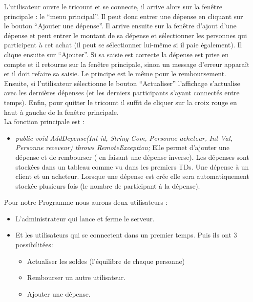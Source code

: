 \documentclass[12,french]{report}
\begin{document}
L’utilisateur ouvre le tricount et se connecte, il arrive alors sur la fenêtre principale : le “menu principal”. Il peut donc entrer une dépense en cliquant sur le bouton “Ajouter une dépense”. Il arrive ensuite sur la fenêtre d’ajout d’une dépense et peut entrer le montant de sa dépense et sélectionner les personnes qui participent à cet achat (il peut se sélectionner lui-même si il paie également). Il clique ensuite sur “Ajouter”. Si sa saisie est correcte la dépense est prise en compte et il retourne sur la fenêtre principale, sinon un message d’erreur apparaît et il doit refaire sa saisie.
Le principe est le même pour le remboursement.
Ensuite, si l’utilisateur sélectionne le bouton “Actualiser” l’affichage s’actualise avec les dernières dépenses (et les derniers participants s'ayant connectés entre temps).
Enfin, pour quitter le tricount il suffit de cliquer sur la croix rouge en haut à gauche de la fenêtre principale.\\

La fonction principale est :\\

\begin{itemize}[label=\textbullet]
	\item \textit{public void AddDepense(Int id, String Com, Personne acheteur, Int Val, Personne receveur) throws RemoteException;}
Elle permet d’ajouter une dépense et de rembourser ( en faisant une dépense inverse). Les dépenses sont stockées dans un tableau comme vu dans les premiers TDs. Une dépense à un client et un acheteur. Lorsque une dépense est crée elle sera automatiquement stockée plusieurs fois (le nombre de participant à la dépense).
\end{itemize}\vspace{0.5cm}

Pour notre Programme nous aurons deux utilisateurs :\\

\begin{itemize}[label=\textbullet]
\item L’administrateur qui lance et ferme le serveur.\\
\item Et les utilisateurs qui se connectent dans un premier temps. Puis ils ont 3 possibilitées:\\
	\begin{itemize}
	\item Actualiser les soldes (l’équilibre de chaque personne)\\
	\item Rembourser un autre utilisateur.\\
	\item Ajouter une dépense.\\
	\end{itemize}
\end{itemize}
\end{document}
